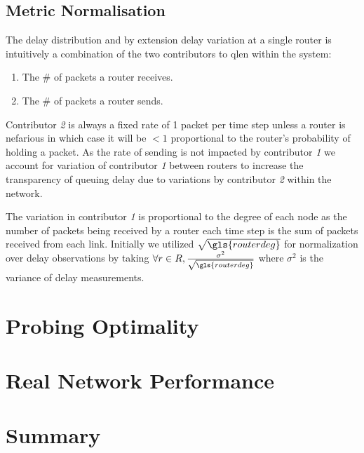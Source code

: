 \subsection{Metric Normalisation}
\label{ssec:Rmetricnormalisation}
The delay distribution and by extension delay variation at a single router is intuitively a combination of the two contributors to \gls{qlen} within the system:
\begin{enumerate}
    \item The \# of packets a router receives.
    \item The \# of packets a router sends.
\end{enumerate}
Contributor \emph{2} is always a fixed rate of 1 packet per time step unless a router is nefarious in which case it will be $<1$ proportional to the router's probability of holding a packet. As the rate of sending is not impacted by contributor \emph{1} we account for variation of contributor \emph{1} between routers to increase the transparency of queuing delay due to variations by contributor \emph{2} within the network.\par
The variation in contributor \emph{1} is proportional to the degree of each node as the number of packets being received by a router each time step is the sum of packets received from each link. Initially we utilized $\sqrt{\gls{routerdeg}}$ for normalization over delay observations by taking $\forall r\in R, \frac{\sigma^2}{\sqrt{\gls{routerdeg}}}$ where $\sigma^2$ is the variance of delay measurements.

\section{Probing Optimality}
\label{sec:Rprobingoptimality}

\section{Real Network Performance}
\label{sec:Rrealnetworkperformance}

\section{Summary}
